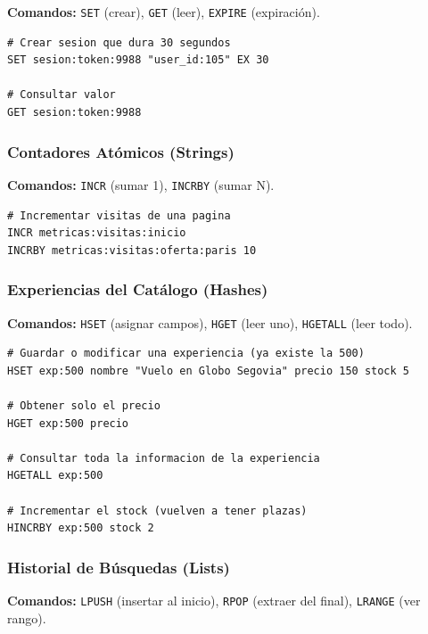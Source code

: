 \documentclass[12pt,a4paper]{article}
\begin{document}
\textbf{Comandos:} \texttt{SET} (crear),
\texttt{GET} (leer), \texttt{EXPIRE}
(expiración).

\begin{lstlisting}
# Crear sesion que dura 30 segundos
SET sesion:token:9988 "user_id:105" EX 30

# Consultar valor
GET sesion:token:9988
\end{lstlisting}

\hypertarget{b.-contadores-atuxf3micos-strings}{%
\subsubsection{Contadores Atómicos
(Strings)}\label{b.-contadores-atuxf3micos-strings}}

\textbf{Comandos:} \texttt{INCR} (sumar 1),
\texttt{INCRBY} (sumar N).

\begin{lstlisting}
# Incrementar visitas de una pagina
INCR metricas:visitas:inicio
INCRBY metricas:visitas:oferta:paris 10
\end{lstlisting}

\hypertarget{c.-perfiles-de-usuario-hashes}{%
\subsubsection{Experiencias del Catálogo
(Hashes)}\label{c.-perfiles-de-usuario-hashes}}

\textbf{Comandos:} \texttt{HSET} (asignar campos),
\texttt{HGET} (leer uno),
\texttt{HGETALL} (leer todo).

\begin{lstlisting}
# Guardar o modificar una experiencia (ya existe la 500)
HSET exp:500 nombre "Vuelo en Globo Segovia" precio 150 stock 5

# Obtener solo el precio
HGET exp:500 precio

# Consultar toda la informacion de la experiencia
HGETALL exp:500

# Incrementar el stock (vuelven a tener plazas)
HINCRBY exp:500 stock 2
\end{lstlisting}

\hypertarget{d.-colas-de-trabajo-lists}{%
\subsubsection{Historial de Búsquedas
(Lists)}\label{d.-colas-de-trabajo-lists}}

\textbf{Comandos:} \texttt{LPUSH} (insertar al inicio),
\texttt{RPOP} (extraer del final),
\texttt{LRANGE} (ver rango).
\end{document}

